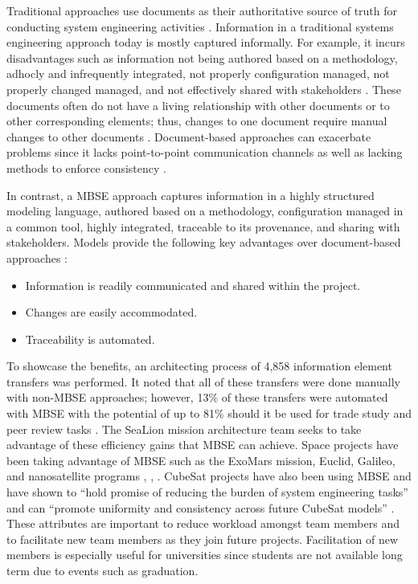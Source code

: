 \documentclass[journal,article,submit,pdftex,moreauthors]{Definitions/mdpi}
\begin{document}
Traditional approaches use documents as their authoritative source of truth for conducting system engineering activities \cite{architecting_spacecraft}.  Information in a traditional systems engineering approach today is mostly captured informally.  For example, it incurs disadvantages such as information not being authored based on a methodology, adhocly and infrequently integrated, not properly configuration managed, not properly changed managed, and not effectively shared with stakeholders \cite{caesar_model_based_approach}.  These documents often do not have a living relationship with other documents or to other corresponding elements; thus, changes to one document require manual changes to other documents \cite{ibm_mbse}.  Document-based approaches can exacerbate problems since it lacks point-to-point communication channels as well as lacking methods to enforce consistency \cite{call_herber_2022}.  

In contrast, a MBSE approach captures information in a highly structured modeling language, authored based on a methodology, configuration managed in a common tool, highly integrated, traceable to its provenance, and sharing with stakeholders.  Models provide the following key advantages over document-based approaches \cite{ibm_mbse}: 

\begin{itemize}
	\item	Information is readily communicated and shared within the project.
	\item	Changes are easily accommodated.
	\item	Traceability is automated.
\end{itemize}

To showcase the benefits, an architecting process of 4,858 information element transfers was performed.  It noted that all of these transfers were done manually with non-MBSE approaches; however, 13\% of these transfers were automated with MBSE with the potential of up to 81\% should it be used for trade study and peer review tasks \cite{younse_cameron_bradley_2021}.  The SeaLion mission architecture team seeks to take advantage of these efficiency gains that MBSE can achieve.  Space projects have been taking advantage of MBSE such as the ExoMars mission, Euclid, Galileo, and nanosatellite programs \cite{mazzini}, \cite{esa}, \cite{nottage_corns_2012}.  CubeSat projects have also been using MBSE and have shown to “hold promise of reducing the burden of system engineering tasks” \cite{kaslow} and can “promote uniformity and consistency across future CubeSat models” \cite{kaslow}.  These attributes are important to reduce workload amongst team members and to facilitate new team members as they join future projects.  Facilitation of new members is especially useful for universities since students are not available long term due to events such as graduation.
\end{document}
